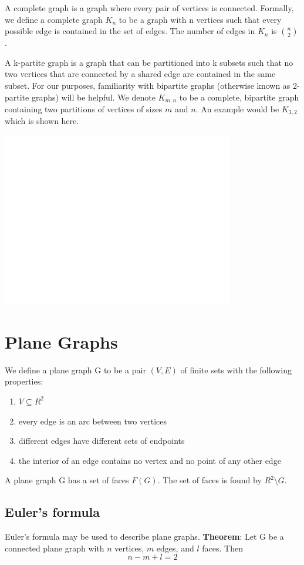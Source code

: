 A complete graph is a graph where every pair of vertices is connected. Formally, we define a complete graph $K_n$ to be a graph with n vertices such that every possible edge is contained in the set of edges. The number of edges in $K_n$ is $n\choose{2}$. 
	
A k-partite graph is a graph that can be partitioned into k subsets such that no two vertices that are connected by a shared edge are contained in the same subset. For our purposes, familiarity with bipartite graphs (otherwise known as 2-partite graphs) will be helpful. We denote $K_{m,n}$ to be a complete, bipartite graph containing two partitions of vertices of sizes $m$ and $n$. An example would be $K_{3,2}$ which is shown here.

\includegraphics[height = 3in]{white.png}

\section{Plane Graphs}

We define a plane graph G to be a pair $(V,E)$ of finite sets with the following properties:
\begin{enumerate}
\item{$V \subseteq R^2$}
\item{every edge is an arc between two vertices}
\item{different edges have different sets of endpoints}
\item{the interior of an edge contains no vertex and no point of any other edge}
\end{enumerate}

A plane graph G has a set of faces $F(G)$. The set of faces is found by $R^2 \setminus G$. 

\subsection{Euler's formula}
Euler's formula may be used to describe plane graphs.
\textbf{Theorem}: Let G be a connected plane graph with $n$ vertices, $m$ edges, and $l$ faces. Then 
$$n-m+l=2$$

